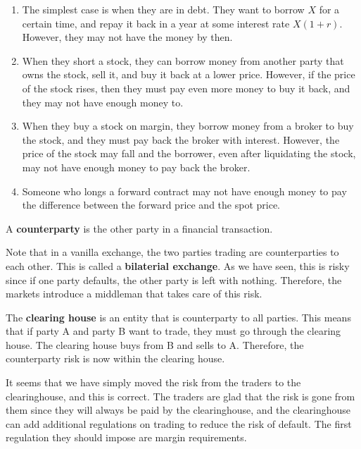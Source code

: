 \documentclass{article}
\begin{document}
    \begin{example}
      \begin{enumerate}
        \item The simplest case is when they are in debt. They want to borrow $X$ for a certain time, and repay it back in a year at some interest rate $X (1 + r)$. However, they may not have the money by then. 
        \item When they short a stock, they can borrow money from another party that owns the stock, sell it, and buy it back at a lower price. However, if the price of the stock rises, then they must pay even more money to buy it back, and they may not have enough money to. 
        \item When they buy a stock on margin, they borrow money from a broker to buy the stock, and they must pay back the broker with interest. However, the price of the stock may fall and the borrower, even after liquidating the stock, may not have enough money to pay back the broker.
        \item Someone who longs a forward contract may not have enough money to pay the difference between the forward price and the spot price.
      \end{enumerate}
    \end{example}

    \begin{definition}[Counterparty]
      A \textbf{counterparty} is the other party in a financial transaction. 
    \end{definition}

    Note that in a vanilla exchange, the two parties trading are counterparties to each other. This is called a \textbf{bilaterial exchange}. As we have seen, this is risky since if one party defaults, the other party is left with nothing. Therefore, the markets introduce a middleman that takes care of this risk. 

    \begin{definition}
      The \textbf{clearing house} is an entity that is counterparty to all parties. This means that if party A and party B want to trade, they must go through the clearing house. The clearing house buys from B and sells to A. Therefore, the counterparty risk is now within the clearing house.
    \end{definition}

    It seems that we have simply moved the risk from the traders to the clearinghouse, and this is correct. The traders are glad that the risk is gone from them since they will always be paid by the clearinghouse, and the clearinghouse can add additional regulations on trading to reduce the risk of default. The first regulation they should impose are margin requirements. 
\end{document}
